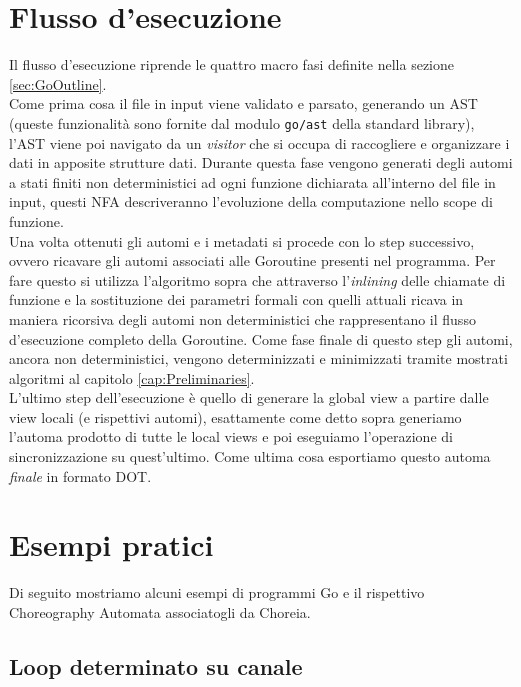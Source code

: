 \section{Flusso d'esecuzione}
Il flusso d'esecuzione riprende le quattro macro fasi definite nella sezione \ref{sec:GoOutline}.\bigskip\\
Come prima cosa il file in input viene validato e parsato, generando un AST (queste funzionalità sono fornite dal modulo \texttt{go/ast} della standard library), l'AST viene poi navigato da un \emph{visitor} che si occupa di raccogliere e organizzare i dati in apposite strutture dati. Durante questa fase vengono generati degli automi a stati finiti non deterministici ad ogni funzione dichiarata all'interno del file in input, questi NFA descriveranno l'evoluzione della computazione nello scope di funzione.\bigskip\\
Una volta ottenuti gli automi e i metadati si procede con lo step successivo, ovvero ricavare gli automi associati alle Goroutine presenti nel programma. Per fare questo si utilizza l'algoritmo sopra che attraverso l'\emph{inlining} delle chiamate di funzione e la sostituzione dei parametri formali con quelli attuali ricava in maniera ricorsiva degli automi non deterministici che rappresentano il flusso d'esecuzione completo della Goroutine. Come fase finale di questo step gli automi, ancora non deterministici, vengono determinizzati e minimizzati tramite mostrati algoritmi al capitolo \ref{cap:Preliminaries}.\bigskip\\
L'ultimo step dell'esecuzione è quello di generare la global view a partire dalle view locali (e rispettivi automi), esattamente come detto sopra generiamo l'automa prodotto di tutte le local views e poi eseguiamo l'operazione di sincronizzazione su quest'ultimo. Come ultima cosa esportiamo questo automa \emph{finale} in formato DOT.

\section{Esempi pratici}
Di seguito mostriamo alcuni esempi di programmi Go e il rispettivo Choreography Automata associatogli da Choreia. %

\subsection{Loop determinato su canale}
\begin{minipage}[t]{0.50\textwidth}
    
\end{minipage}\hfill
\begin{minipage}[t]{0.45\textwidth}
\end{minipage}


